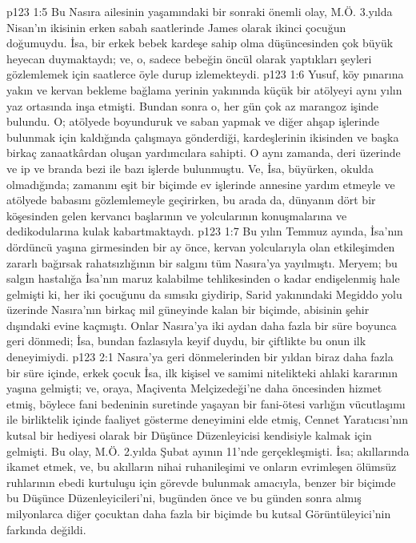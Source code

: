 \vs p123 1:5 Bu Nasıra ailesinin yaşamındaki bir sonraki önemli olay, M.Ö. 3.yılda Nisan’ın ikisinin erken sabah saatlerinde James olarak ikinci çocuğun doğumuydu. İsa, bir erkek bebek kardeşe sahip olma düşüncesinden çok büyük heyecan duymaktaydı; ve, o, sadece bebeğin öncül olarak yaptıkları şeyleri gözlemlemek için saatlerce öyle durup izlemekteydi.
\vs p123 1:6 Yusuf, köy pınarına yakın ve kervan bekleme bağlama yerinin yakınında küçük bir atölyeyi aynı yılın yaz ortasında inşa etmişti. Bundan sonra o, her gün çok az marangoz işinde bulundu. O; atölyede boyunduruk ve saban yapmak ve diğer ahşap işlerinde bulunmak için kaldığında çalışmaya gönderdiği, kardeşlerinin ikisinden ve başka birkaç zanaatkârdan oluşan yardımcılara sahipti. O aynı zamanda, deri üzerinde ve ip ve branda bezi ile bazı işlerde bulunmuştu. Ve, İsa, büyürken, okulda olmadığında; zamanını eşit bir biçimde ev işlerinde annesine yardım etmeyle ve atölyede babasını gözlemlemeyle geçirirken, bu arada da, dünyanın dört bir köşesinden gelen kervancı başlarının ve yolcularının konuşmalarına ve dedikodularına kulak kabartmaktaydı.
\vs p123 1:7 Bu yılın Temmuz ayında, İsa’nın dördüncü yaşına girmesinden bir ay önce, kervan yolcularıyla olan etkileşimden zararlı bağırsak rahatsızlığının bir salgını tüm Nasıra’ya yayılmıştı. Meryem; bu salgın hastalığa İsa’nın maruz kalabilme tehlikesinden o kadar endişelenmiş hale gelmişti ki, her iki çocuğunu da sımsıkı giydirip, Sarid yakınındaki Megiddo yolu üzerinde Nasıra’nın birkaç mil güneyinde kalan bir biçimde, abisinin şehir dışındaki evine kaçmıştı. Onlar Nasıra’ya iki aydan daha fazla bir süre boyunca geri dönmedi; İsa, bundan fazlasıyla keyif duydu, bir çiftlikte bu onun ilk deneyimiydi.
\vs p123 2:1 Nasıra’ya geri dönmelerinden bir yıldan biraz daha fazla bir süre içinde, erkek çocuk İsa, ilk kişisel ve samimi nitelikteki ahlaki kararının yaşına gelmişti; ve, oraya, Maçiventa Melçizedeği’ne daha öncesinden hizmet etmiş, böylece fani bedeninin suretinde yaşayan bir fani\hyp{}ötesi varlığın vücutlaşımı ile birliktelik içinde faaliyet gösterme deneyimini elde etmiş, Cennet Yaratıcısı’nın kutsal bir hediyesi olarak bir Düşünce Düzenleyicisi kendisiyle kalmak için gelmişti. Bu olay, M.Ö. 2.yılda Şubat ayının 11’nde gerçekleşmişti. İsa; akıllarında ikamet etmek, ve, bu akılların nihai ruhanileşimi ve onların evrimleşen ölümsüz ruhlarının ebedi kurtuluşu için görevde bulunmak amacıyla, benzer bir biçimde bu Düşünce Düzenleyicileri’ni, bugünden önce ve bu günden sonra almış milyonlarca diğer çocuktan daha fazla bir biçimde bu kutsal Görüntüleyici’nin farkında değildi.
